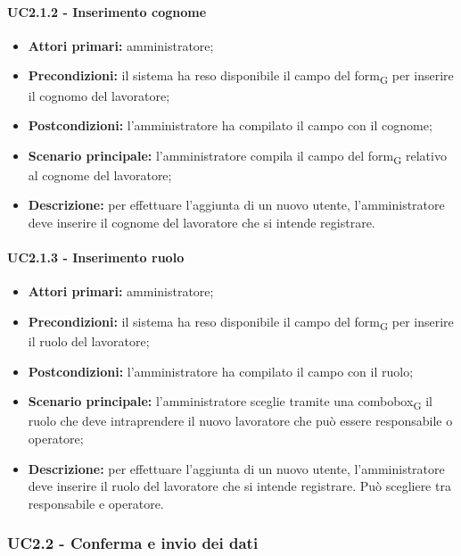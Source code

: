 \paragraph{UC2.1.2 - Inserimento cognome}

\begin{itemize}
	\item 	\textbf{Attori primari:} amministratore;
	\item 	\textbf{Precondizioni:} il sistema ha reso disponibile il campo del \gls{form}\textsubscript{G} per inserire il cognomo del lavoratore;
	\item 	\textbf{Postcondizioni:} l'amministratore ha compilato il campo con il cognome;
	\item 	\textbf{Scenario principale:} l'amministratore compila il campo del \gls{form}\textsubscript{G} relativo al cognome del lavoratore;
	\item 	\textbf{Descrizione:} per effettuare l'aggiunta di un nuovo utente, l'amministratore deve inserire il cognome del lavoratore che si intende registrare.
	
\end{itemize}

\paragraph{UC2.1.3 - Inserimento ruolo}

\begin{itemize}
	\item 	\textbf{Attori primari:} amministratore;
	\item 	\textbf{Precondizioni:} il sistema ha reso disponibile il campo del \gls{form}\textsubscript{G} per inserire il ruolo del lavoratore;
	\item 	\textbf{Postcondizioni:} l’amministratore ha compilato il campo con il ruolo;
	\item 	\textbf{Scenario principale:} l’amministratore sceglie tramite una \gls{combobox}\textsubscript{G} il ruolo che deve intraprendere il nuovo lavoratore che può essere responsabile o operatore;
	\item 	\textbf{Descrizione:} per effettuare l’aggiunta di un nuovo utente, l’amministratore deve inserire il ruolo del lavoratore che si intende registrare. Può scegliere tra responsabile e operatore.
	
\end{itemize}


\subsubsection{UC2.2 - Conferma e invio dei dati}

